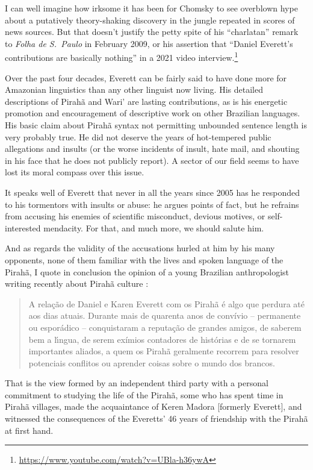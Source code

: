 \documentclass[output=paper,colorlinks,citecolor=brown
]{langscibook}
\begin{document}
I can well imagine how irksome it has been for Chomsky to see overblown
hype about a putatively theory-shaking discovery in the jungle repeated
in scores of news sources. But that doesn't justify the petty spite of
his ``charlatan'' remark to \textit{Folha de S.~Paulo} in February 2009,
or his assertion that ``Daniel Everett's contributions are basically
nothing'' in a 2021 video interview.\footnote{%
   \url{https://www.youtube.com/watch?v=UBla-h36ywA}}

Over the past four decades, Everett can be fairly said to have done
more for Amazonian linguistics than any other linguist now living.
His detailed descriptions of Pirah{\~a} and Wari' are lasting
contributions, as is his energetic promotion and encouragement of
descriptive work on other Brazilian languages. His basic claim about
Pirah{\~a} syntax not permitting unbounded sentence length is very
probably true. He did not deserve the years of hot-tempered public
allegations and insults (or the worse incidents of insult, hate mail,
and shouting in his face that he does not publicly report). A sector
of our field seems to have lost its moral compass over this issue.

It speaks well of Everett that never in all the years since 2005 has
he responded to his tormentors with insults or abuse: he argues points
of fact, but he refrains from accusing his enemies of scientific
misconduct, devious motives, or self-interested mendacity. For that,
and much more, we should salute him.

And as regards the validity of the accusations hurled at him by his
many opponents, none of them familiar with the lives and spoken
language of the Pirah{\~a}, I quote in conclusion the opinion of a
young Brazilian anthropologist writing recently about Pirah{\~a}
culture \citep{Felizes23}\addpages:
\begin{quote}
A rela{\c{c}}{\~a}o de Daniel e Karen Everett com os Pirah{\~a} {\'e}
algo que perdura at{\'e} aos dias atuais. Durante mais de quarenta
anos de convívio – permanente ou espor{\'a}dico – conquistaram a
reputa{\c{c}}{\~a}o de grandes amigos, de saberem bem a l{\'\i}ngua, de
serem exímios contadores de histórias e de se tornarem importantes
aliados, a quem os Pirah{\~a} geralmente recorrem para resolver
potenciais conflitos ou aprender coisas sobre o mundo dos brancos.

\end{quote}
That is the view formed by an independent third party with a personal
commitment to studying the life of the Pirah{\~a}, some who has spent time
in Pirah{\~a} villages, made the acquaintance of Keren Madora [formerly
Everett], and witnessed the consequences of the Everetts' 46 years of
friendship with the Pirah{\~a} at first hand.
\end{document}
